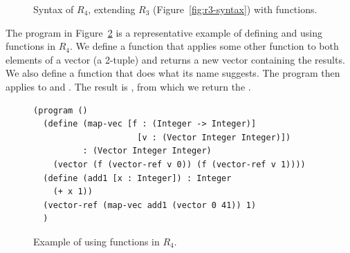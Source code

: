 \documentclass[11pt]{book}
\newcommand{\gray}[1]{{\color{lightgray} #1}}
\begin{document}
\begin{figure}[tp]
\centering
\fbox{
\begin{minipage}{0.96\textwidth}
\[
\begin{array}{lcl}
  \Type &::=& \gray{ \key{Integer} \mid \key{Boolean}
         \mid (\key{Vector}\;\Type^{+}) \mid \key{Void}  } \mid (\Type^{*} \; \key{->}\; \Type) \\
\itm{cmp} &::= & \gray{  \key{eq?} \mid \key{<} \mid \key{<=} \mid \key{>} \mid \key{>=}  } \\
  \Exp &::=& \gray{ \Int \mid (\key{read}) \mid (\key{-}\;\Exp) \mid (\key{+} \; \Exp\;\Exp) \mid (\key{-}\;\Exp\;\Exp)}  \\
    &\mid&  \gray{ \Var \mid \LET{\Var}{\Exp}{\Exp} }\\
    &\mid& \gray{ \key{\#t} \mid \key{\#f} 
    \mid (\key{and}\;\Exp\;\Exp)
    \mid (\key{or}\;\Exp\;\Exp)
    \mid (\key{not}\;\Exp)} \\
   &\mid& \gray{(\itm{cmp}\;\Exp\;\Exp) \mid \IF{\Exp}{\Exp}{\Exp}} \\
  &\mid& \gray{(\key{vector}\;\Exp^{+}) \mid
    (\key{vector-ref}\;\Exp\;\Int)} \\
  &\mid& \gray{(\key{vector-set!}\;\Exp\;\Int\;\Exp)\mid (\key{void})} \\
      &\mid& (\Exp \; \Exp^{*}) \\
  \Def &::=& (\key{define}\; (\Var \; [\Var \key{:} \Type]^{*}) \key{:} \Type \; \Exp) \\
  R_4 &::=& (\key{program} \;\itm{info}\; \Def^{*} \; \Exp)
\end{array}
\]
\end{minipage}
}
\caption{Syntax of $R_4$, extending $R_3$ (Figure~\ref{fig:r3-syntax})
  with functions.}
\label{fig:r4-syntax}
\end{figure}

The program in Figure~\ref{fig:r4-function-example} is a
representative example of defining and using functions in $R_4$.  We
define a function  that applies some other function
 to both elements of a vector (a 2-tuple) and returns a new
vector containing the results. We also define a function 
that does what its name suggests. The program then applies
 to  and .  The result is
, from which we return the .

\begin{figure}[tbp]
\begin{lstlisting}
(program ()
  (define (map-vec [f : (Integer -> Integer)]
                     [v : (Vector Integer Integer)])
          : (Vector Integer Integer)
    (vector (f (vector-ref v 0)) (f (vector-ref v 1))))
  (define (add1 [x : Integer]) : Integer
    (+ x 1))
  (vector-ref (map-vec add1 (vector 0 41)) 1)
  )
\end{lstlisting}
\caption{Example of using functions in $R_4$.}
\label{fig:r4-function-example}
\end{figure}
\end{document}

